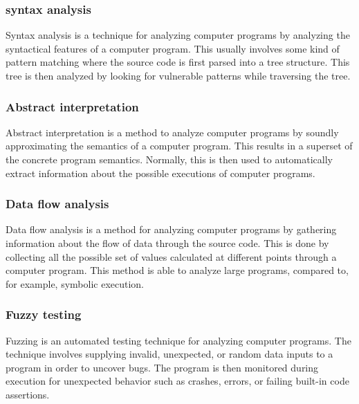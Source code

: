 \subsubsection{syntax analysis}
\label{sec:syntax-analysis}
Syntax analysis is a technique for analyzing computer programs by analyzing the syntactical features of a computer program. This usually involves some kind of pattern matching where the source code is first parsed into a tree structure. This tree is then analyzed by looking for vulnerable patterns while traversing the tree.

\subsubsection{Abstract interpretation}
\label{sec:abstract-interpretation}
Abstract interpretation is a method to analyze computer programs by soundly approximating the semantics of a computer program. This results in a superset of the concrete program semantics. Normally, this is then used to automatically extract information about the possible executions of computer programs.

\subsubsection{Data flow analysis}
\label{sec:data-flow-analysis}
Data flow analysis is a method for analyzing computer programs by gathering information about the flow of data through the source code. This is done by collecting all the possible set of values calculated at different points through a computer program. This method is able to analyze large programs, compared to, for example, symbolic execution.

\subsubsection{Fuzzy testing}
\label{sec:fuzzy-testing}
Fuzzing is an automated testing technique for analyzing computer programs. The technique involves supplying invalid, unexpected, or random data inputs to a program in order to uncover bugs. The program is then monitored during execution for unexpected behavior such as crashes, errors, or failing built-in code assertions.

